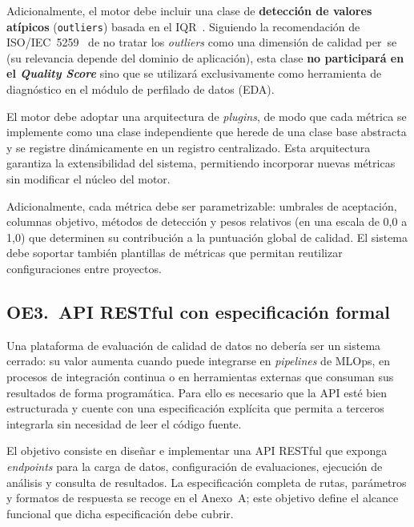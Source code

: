 Adicionalmente, el motor debe incluir una clase de \textbf{detección de
valores atípicos} (\texttt{outliers}) basada en el \ac{IQR}~\citep{tukey1977}.
Siguiendo la recomendación de \ac{ISO}/IEC~5259~\citep{iso5259} de no tratar
los \emph{outliers} como una dimensión de calidad per~se (su relevancia
depende del dominio de aplicación), esta clase \textbf{no participará en
el \emph{Quality Score}} sino que se utilizará exclusivamente como
herramienta de diagnóstico en el módulo de perfilado de datos (\ac{EDA}).

El motor debe adoptar una arquitectura de \emph{plugins}, de modo que cada
métrica se implemente como una clase independiente que herede de una clase
base abstracta y se registre dinámicamente en un registro centralizado.
Esta arquitectura garantiza la extensibilidad del sistema, permitiendo
incorporar nuevas métricas sin modificar el núcleo del motor.

Adicionalmente, cada métrica debe ser parametrizable: umbrales de aceptación,
columnas objetivo, métodos de detección y pesos relativos (en una escala de
0,0 a 1,0) que determinen su contribución a la puntuación global de calidad.
El sistema debe soportar también plantillas de métricas que permitan
reutilizar configuraciones entre proyectos.


\subsection{OE3.\ \acs{API} \acs{REST}ful con especificación formal}
\label{sec:oe3}

Una plataforma de evaluación de calidad de datos no debería ser un sistema
cerrado: su valor aumenta cuando puede integrarse en \emph{pipelines} de
\ac{MLOps}, en procesos de integración continua o en herramientas externas
que consuman sus resultados de forma programática.  Para ello es necesario
que la \ac{API} esté bien estructurada y cuente con una especificación
explícita que permita a terceros integrarla sin necesidad de leer el código
fuente.

El objetivo consiste en diseñar e implementar una \ac{API} \ac{REST}ful que
exponga \emph{endpoints} para la carga de datos, configuración de evaluaciones,
ejecución de análisis y consulta de resultados.  La especificación completa de
rutas, parámetros y formatos de respuesta se recoge en el Anexo~A; este
objetivo define el alcance funcional que dicha especificación debe cubrir.

